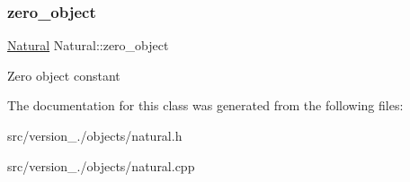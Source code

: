 \subsubsection{\texorpdfstring{zero\+\_\+object}{zero\_object}}
{\footnotesize\ttfamily \hyperlink{classez_1_1objects_1_1Natural}{Natural} Natural\+::zero\+\_\+object\hspace{0.3cm}{\ttfamily [static]}}

Zero object constant 

The documentation for this class was generated from the following files\+:\begin{DoxyCompactItemize}
\item 
src/version\+\_./objects/natural.\+h\item 
src/version\+\_./objects/natural.\+cpp\end{DoxyCompactItemize}
